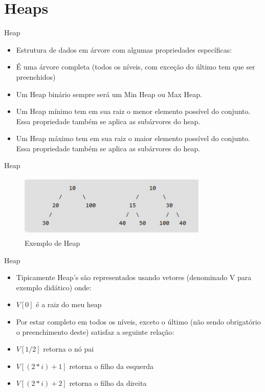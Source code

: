 \section{Heaps}

\begin{frame}
	\begin{block}{Heap}
		\begin{itemize}
			\item Estrutura de dados em árvore com algumas propriedades específicas:
			\item É uma árvore completa (todos os níveis, com exceção do último tem que ser preenchidos)
			\item Um Heap binário sempre será um Min Heap ou Max Heap.
			\item Um Heap mínimo tem em sua raiz o menor elemento possível do conjunto. Essa propriedade também se aplica as subárvores do heap.
			\item Um Heap máximo tem em sua raiz o maior elemento possível do conjunto. Essa propriedade também se aplica as subárvores do heap.
		\end{itemize}
	\end{block}
\end{frame}

\begin{frame}
	\begin{block}{Heap}
		\begin{figure}[!htb]
			\centering	  				
			\includegraphics[height=3cm, width = 9cm]{./pic/heap.jpg}
			\caption{Exemplo de Heap}
			\label{fig_pilha}
		\end{figure}
	\end{block}
\end{frame}

\begin{frame}
	\begin{block}{Heap}
		\begin{itemize}
			\item Tipicamente Heap's são representados usando vetores (denominado V para exemplo didático) onde:
			\item  $V[0]$ é a raiz do meu heap
			\item Por estar completo em todos os níveis, exceto o último (não sendo obrigatório o preenchimento deste) satisfaz a seguinte relação:
			\item $V[1/2]$ retorna o nó pai
			\item $V[(2*i)+1]$ retorna o filho da esquerda
			\item $V[(2*i)+2]$ retorna o filho da direita
		\end{itemize}
	\end{block}
\end{frame}

